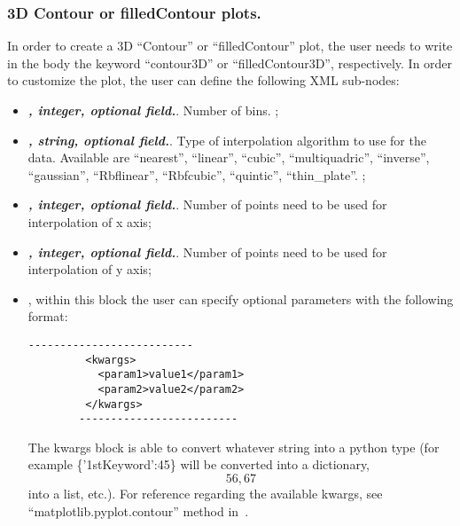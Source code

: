 \subsubsection{3D Contour or filledContour plots.}
In order to create a 3D ``Contour'' or ``filledContour'' plot, the user needs to
write in the  body the keyword ``contour3D'' or ``filledContour3D'',
respectively.
%
In order to customize the plot, the user can define the following XML sub-nodes:
  \begin{itemize}
  \item {}\textbf{\textit{, integer, optional field.}}.
  Number of bins.
  ;
  \item {}\textbf{\textit{, string, optional field.}}.
  Type of interpolation algorithm to use for the data.
  Available are ``nearest'', ``linear'', ``cubic'', ``multiquadric'',
  ``inverse'', ``gaussian'', ``Rbflinear'', ``Rbfcubic'', ``quintic'',
  ``thin\_plate''.
  ;
  \item {}\textbf{\textit{, integer, optional field.}}.
  Number of points need to be used for interpolation of x axis;
  \item {}\textbf{\textit{, integer, optional field.}}.
  Number of points need to be used for interpolation of y axis;
  \item \textit{}, within this block the user can specify optional
  parameters with the following format:
        \begin{lstlisting}[style=XML]
        --------------------------
         <kwargs>
           <param1>value1</param1>
           <param2>value2</param2>
         </kwargs>
        -------------------------
       \end{lstlisting}
  The kwargs block is able to convert whatever string into a python type (for
  example \{'1stKeyword':45\} will be converted into a
  dictionary, \[56,67\] into a list, etc.).
  For reference regarding the available kwargs, see
  ``matplotlib.pyplot.contour'' method in~\cite{MatPlotLib}.
    \end{itemize}


